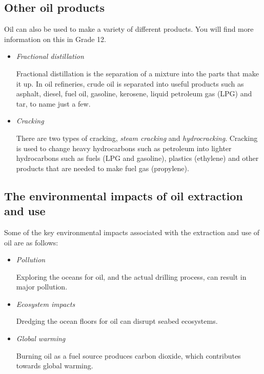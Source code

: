 \subsection{Other oil products}

Oil can also be used to make a variety of different products. You will find more information on this in Grade 12.

\begin{itemize}
\item{\textit{Fractional distillation}

Fractional distillation is the separation of a mixture into the parts that make it up. In oil refineries, crude oil is separated into useful products such as asphalt, diesel, fuel oil, gasoline, kerosene, liquid petroleum gas (LPG) and tar, to name just a few.
}

\item{\textit{Cracking}

There are two types of cracking, \textit{steam cracking} and \textit{hydrocracking}. Cracking is used to change heavy hydrocarbons such as petroleum into lighter hydrocarbons such as fuels (LPG and gasoline), plastics (ethylene) and other products that are needed to make fuel gas (propylene).
}
\end{itemize}

\subsection{The environmental impacts of oil extraction and use}

Some of the key environmental impacts associated with the extraction and use of oil are as follows:

\begin{itemize}
\item{\textit{Pollution}

Exploring the oceans for oil, and the actual drilling process, can result in major pollution.}

\item{\textit{Ecosystem impacts}

Dredging the ocean floors for oil can disrupt seabed ecosystems.
}

\item{\textit{Global warming}

Burning oil as a fuel source produces carbon dioxide, which contributes towards global warming.
}
\end{itemize}





